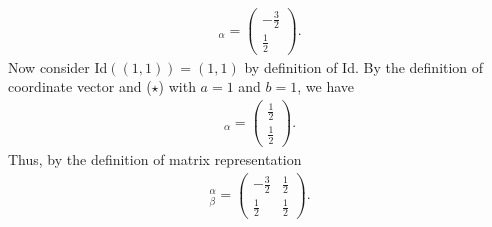\documentclass[12pt,answers]{exam}
\begin{document}
\begin{solution}
\begin{enumerate}[label=(\alph*)]
\begin{align*}
    [\text{Id}(-1,1)]_{\alpha}=\begin{pmatrix} -\frac{3}{2} \\ \frac{1}{2} \end{pmatrix}.
\end{align*}
Now consider Id$((1,1))=(1,1)$ by definition of Id. By the definition of coordinate vector and ($\star$) with $a=1$ and $b=1$, we have
\begin{align*}
    [\text{Id}(1,1)]_{\alpha}=\begin{pmatrix} \frac{1}{2} \\ \frac{1}{2} \end{pmatrix}.
\end{align*}
Thus, by the definition of matrix representation
\begin{align*}
    [\text{Id}]^{\alpha}_{\beta}=\begin{pmatrix} -\frac{3}{2} & \frac{1}{2} \\ \frac{1}{2} & \frac{1}{2} \end{pmatrix}.
\end{align*}
\end{enumerate}
\end{solution}
\end{document}

